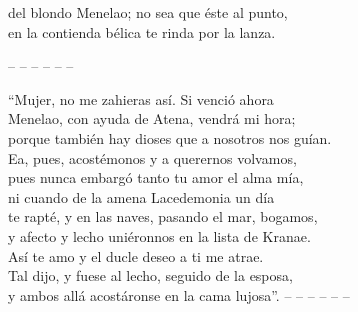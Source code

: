 del blondo Menelao; no sea que éste al punto,\\
en la contienda bélica te rinda por la lanza.\par
\pend
%
\noindent-- -- -- -- -- --\par
%
\pstart
{}``Mujer, no me zahieras así. Si venció ahora\\
Menelao, con ayuda de Atena, vendrá mi hora;\\
porque también hay dioses que a nosotros nos guían.\\
Ea, pues, acostémonos y a querernos volvamos,\\
pues nunca embargó tanto tu amor el alma mía,\\
ni cuando de la amena Lacedemonia un día\\
te rapté, y en las naves, pasando el mar, bogamos,\\
y afecto y lecho uniéronnos en la lista de Kranae.\\
Así te amo y el ducle deseo a ti me atrae.\\
Tal dijo, y fuese al lecho, seguido de la esposa,\\
y ambos allá acostáronse en la cama lujosa''.
\pend
%
\noindent-- -- -- -- -- --\par
%
\endnumbering